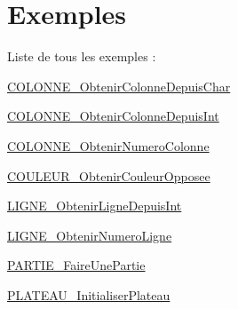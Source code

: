 \section{Exemples}
Liste de tous les exemples \+:\begin{DoxyCompactItemize}
\item 
\hyperlink{COLONNE_ObtenirColonneDepuisChar-example}{C\+O\+L\+O\+N\+N\+E\+\_\+\+Obtenir\+Colonne\+Depuis\+Char}
\item 
\hyperlink{COLONNE_ObtenirColonneDepuisInt-example}{C\+O\+L\+O\+N\+N\+E\+\_\+\+Obtenir\+Colonne\+Depuis\+Int}
\item 
\hyperlink{COLONNE_ObtenirNumeroColonne-example}{C\+O\+L\+O\+N\+N\+E\+\_\+\+Obtenir\+Numero\+Colonne}
\item 
\hyperlink{COULEUR_ObtenirCouleurOpposee-example}{C\+O\+U\+L\+E\+U\+R\+\_\+\+Obtenir\+Couleur\+Opposee}
\item 
\hyperlink{LIGNE_ObtenirLigneDepuisInt-example}{L\+I\+G\+N\+E\+\_\+\+Obtenir\+Ligne\+Depuis\+Int}
\item 
\hyperlink{LIGNE_ObtenirNumeroLigne-example}{L\+I\+G\+N\+E\+\_\+\+Obtenir\+Numero\+Ligne}
\item 
\hyperlink{PARTIE_FaireUnePartie-example}{P\+A\+R\+T\+I\+E\+\_\+\+Faire\+Une\+Partie}
\item 
\hyperlink{PLATEAU_InitialiserPlateau-example}{P\+L\+A\+T\+E\+A\+U\+\_\+\+Initialiser\+Plateau}
\end{DoxyCompactItemize}
